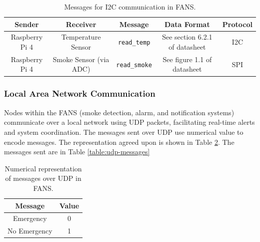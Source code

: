 \begin{table}
    \centering
    \begin{tabular}{| c | c | c | c | c |}
        \hline
        Sender         & Receiver               & Message              & Data Format                                          & Protocol                 \\
        \hline
        Raspberry Pi 4 & Temperature Sensor     & \texttt{read\_temp}  & See section 6.2.1 of datasheet \cite{temp-datasheet} & I2C                      \\
        \hline
        Raspberry Pi 4 & Smoke Sensor (via ADC) & \texttt{read\_smoke} & See figure 1.1 of datasheet \cite{adc-datasheet}     & SPI \cite{adc-datasheet} \\
        \hline
    \end{tabular}
    \caption{Messages for I2C communication in FANS.}
    \label{table:i2c}
\end{table}

\subsubsection{Local Area Network Communication}

Nodes within the FANS (smoke detection, alarm, and notification systems) communicate over a local network using UDP
packets, facilitating real-time alerts and system coordination. The messages sent over UDP use numerical value to
encode messages. The representation agreed upon is shown in Table \ref{table:udp-rep}. The messages sent are in Table
\ref{table:udp-messages}

\begin{table}
    \centering
    \begin{tabular}{| c | c |}
        \hline
        Message      & Value \\
        \hline
        Emergency    & 0     \\
        \hline
        No Emergency & 1     \\
        \hline
    \end{tabular}
    \caption{Numerical representation of messages over UDP in FANS.}
    \label{table:udp-rep}
\end{table}


